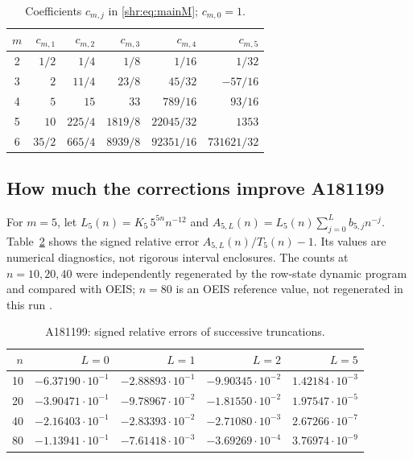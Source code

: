 \documentclass[11pt,letterpaper]{article}
\numberwithin{equation}{section}
\theoremstyle{definition}
\newcommand{\1}{\mathbf 1}
\begin{document}
\begin{table}[ht]
\centering
\caption{Coefficients $c_{m,j}$ in \eqref{shr:eq:mainM}; $c_{m,0}=1$.}
\label{shr:tab:coeffs}
\renewcommand{\arraystretch}{1.3}
\begin{tabular}{c r r r r r}
\toprule
$m$ & $c_{m,1}$ & $c_{m,2}$ & $c_{m,3}$ & $c_{m,4}$ & $c_{m,5}$\\
\midrule
2 & $1/2$ & $1/4$ & $1/8$ & $1/16$ & $1/32$\\
3 & $2$ & $11/4$ & $23/8$ & $45/32$ & $-57/16$\\
4 & $5$ & $15$ & $33$ & $789/16$ & $93/16$\\
5 & $10$ & $225/4$ & $1819/8$ & $22045/32$ & $1353$\\
6 & $35/2$ & $665/4$ & $8939/8$ & $92351/16$ & $731621/32$\\
\bottomrule
\end{tabular}
\end{table}

\subsection{How much the corrections improve A181199}
For $m=5$, let $L_5(n)=K_5\,5^{5n}n^{-12}$ and
$A_{5,L}(n)=L_5(n)\sum_{j=0}^L b_{5,j}n^{-j}$.
Table~\ref{shr:tab:numerics} shows the signed relative error
$A_{5,L}(n)/T_5(n)-1$. Its values are numerical diagnostics, not rigorous
interval enclosures. The counts at $n=10,20,40$ were independently
regenerated by the row-state dynamic program and compared with OEIS;
$n=80$ is an OEIS reference value, not regenerated in this run
\cite{b199}.

\begin{table}[ht]
\centering
\caption{A181199: signed relative errors of successive truncations.}
\label{shr:tab:numerics}
\renewcommand{\arraystretch}{1.2}
\begin{tabular}{r r r r r}
\toprule
$n$ & $L=0$ & $L=1$ & $L=2$ & $L=5$\\
\midrule
10 & $-6.37190\cdot10^{-1}$ & $-2.88893\cdot10^{-1}$ & $-9.90345\cdot10^{-2}$ & $1.42184\cdot10^{-3}$\\
20 & $-3.90471\cdot10^{-1}$ & $-9.78967\cdot10^{-2}$ & $-1.81550\cdot10^{-2}$ & $1.97547\cdot10^{-5}$\\
40 & $-2.16403\cdot10^{-1}$ & $-2.83393\cdot10^{-2}$ & $-2.71080\cdot10^{-3}$ & $2.67266\cdot10^{-7}$\\
80 & $-1.13941\cdot10^{-1}$ & $-7.61418\cdot10^{-3}$ & $-3.69269\cdot10^{-4}$ & $3.76974\cdot10^{-9}$\\
\bottomrule
\end{tabular}
\end{table}
\end{document}
